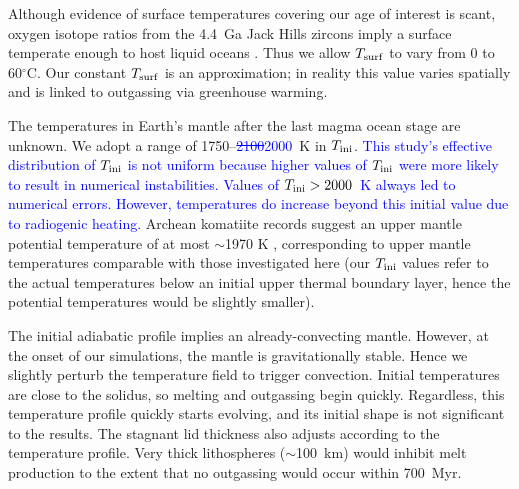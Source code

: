 \documentclass[3p,authoryear]{elsarticle}
\newcommand{\editthree}[2]{\textcolor{blue}{\sout{#1}#2}}
\begin{document}
Although evidence of surface temperatures covering our age of interest is scant, oxygen isotope ratios from the 4.4~Ga Jack Hills zircons imply a surface temperate enough to host liquid oceans \citep{Valley2002}. Thus we allow $T_{\rm surf}$ to vary from 0 to 60$^\circ$C. %
Our constant $T_{\rm surf}$ is an approximation; in reality this value varies spatially and is linked to outgassing via greenhouse warming. 

The temperatures in Earth's mantle after the last magma ocean stage are unknown. We adopt a range of 1750--\editthree{2100}{2000}~K in $T_{\rm ini}$. \editthree{}{This study's effective distribution of $T_{\rm ini}$ is not uniform because higher values of $T_{\rm ini}$ were more likely to result in numerical instabilities. Values of $T_{\rm ini} > 2000$~K always led to numerical errors. However, temperatures do increase beyond this initial value due to radiogenic heating. }Archean komatiite records suggest an upper mantle potential temperature of at most $\sim$1970 K \citep{HERZBERG2010}, corresponding to upper mantle temperatures comparable with those investigated here (our $T_{\rm ini}$ values refer to the actual temperatures below an initial upper thermal boundary layer, hence the potential temperatures would be slightly smaller). 

The initial adiabatic profile implies an already-convecting mantle. However, at the onset of our simulations, the mantle is gravitationally stable. Hence we slightly perturb the temperature field to trigger convection. Initial temperatures are close to the solidus, so melting and outgassing begin quickly.
Regardless, this temperature profile quickly starts evolving, and its initial shape is not significant to the results. The stagnant lid thickness also adjusts according to the temperature profile. Very thick lithospheres ($\sim$100~km) would inhibit melt production to the extent that no outgassing would occur within 700~Myr. 
\end{document}
